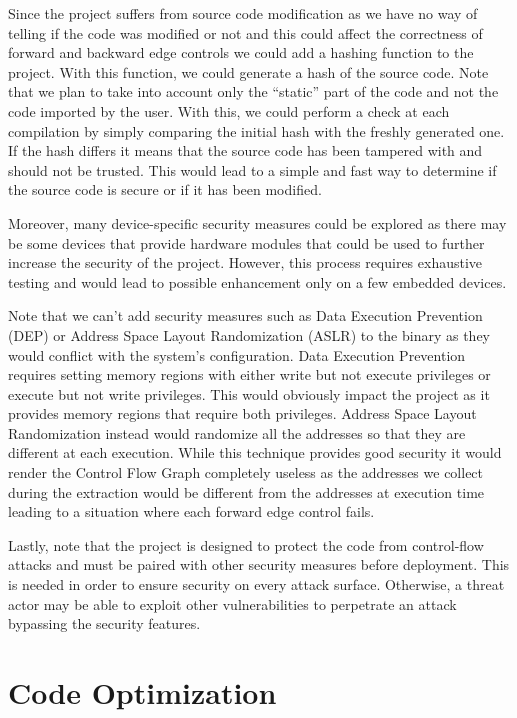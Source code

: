 Since the project suffers from source code modification as we have no way of
telling if the code was modified or not and this could affect the correctness of
forward and backward edge controls we could add a hashing function to the
project. With this function, we could generate a hash of the source code. Note that
we plan to take into account only the ``static'' part of the code and not the code
imported by the user. With this, we could perform a check at each compilation by
simply comparing the initial hash with the freshly generated one. If the hash
differs it means that the source code has been tampered with and should not be
trusted. This would lead to a simple and fast way to determine if the source code
is secure or if it has been modified.

Moreover, many device-specific security measures could be explored as there may
be some devices that provide hardware modules that could be used to further
increase the security of the project. However, this process requires exhaustive
testing and would lead to possible enhancement only on a few embedded devices.

Note that we can't add security measures such as Data Execution Prevention (DEP)
or Address Space Layout Randomization (ASLR) to the binary as they would
conflict with the system's configuration. Data Execution Prevention requires setting
memory regions with either write but not execute privileges or execute but not write
privileges. This would obviously impact the project as it provides memory
regions that require both privileges. Address Space Layout Randomization instead
would randomize all the addresses so that they are different at each execution.
While this technique provides good security it would render the Control Flow
Graph completely useless as the addresses we collect during the extraction would
be different from the addresses at execution time leading to a situation where
each forward edge control fails.

Lastly, note that the project is designed to protect the code from control-flow attacks
and must be paired with other security measures before deployment. This is
needed in order to ensure security on every attack surface. Otherwise, a threat
actor may be able to exploit other vulnerabilities to perpetrate an attack
bypassing the security features.

\section{Code Optimization}
\label{sec:future_optimization}

